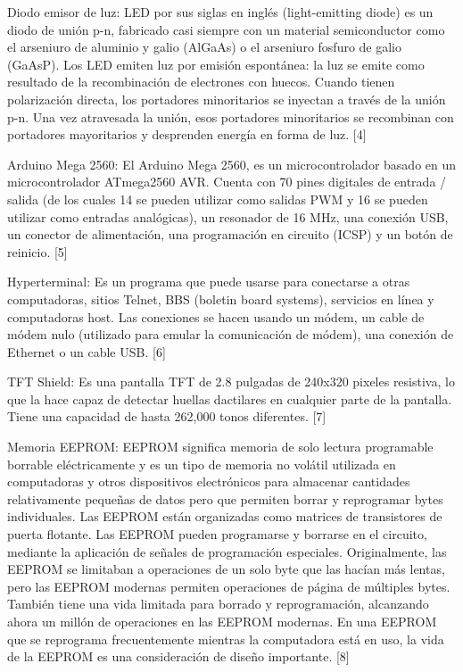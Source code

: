 \documentclass[conference]{IEEEtran}
\begin{document}
Diodo emisor de luz: LED por sus siglas en inglés (light-emitting diode) es un diodo de unión p-n, fabricado casi siempre con un material semiconductor como el arseniuro de aluminio y galio (AlGaAs) o el arseniuro fosfuro de galio (GaAsP). Los LED emiten luz por emisión espontánea: la luz se emite como resultado de la recombinación de electrones con huecos. Cuando tienen polarización directa, los portadores minoritarios se inyectan a través de la unión p-n. Una vez atravesada la unión, esos portadores minoritarios se recombinan con portadores mayoritarios y desprenden energía en forma de luz. [4]

Arduino Mega 2560: El Arduino Mega 2560, es un microcontrolador basado en un microcontrolador ATmega2560 AVR. Cuenta con 70 pines digitales de entrada / salida (de los cuales 14 se pueden utilizar como salidas PWM y 16 se pueden utilizar como entradas analógicas), un resonador de 16 MHz, una conexión USB, un conector de alimentación, una programación en circuito (ICSP) y un botón de reinicio. [5]

Hyperterminal: Es un programa que puede usarse para conectarse a otras computadoras, sitios Telnet, BBS (boletin board systems), servicios en línea y computadoras host. Las conexiones se hacen usando un módem, un cable de módem nulo (utilizado para emular la comunicación de módem), una conexión de Ethernet o un cable USB. [6]

TFT Shield: Es una pantalla TFT de 2.8 pulgadas de 240x320 pixeles resistiva, lo que la hace capaz de detectar huellas dactilares en cualquier parte de la pantalla. Tiene una capacidad de hasta 262,000 tonos diferentes. [7]

Memoria EEPROM: EEPROM significa memoria de solo lectura programable borrable eléctricamente y es un tipo de memoria no volátil utilizada en computadoras y otros dispositivos electrónicos para almacenar cantidades relativamente pequeñas de datos pero que permiten borrar y reprogramar bytes individuales. Las EEPROM están organizadas como matrices de transistores de puerta flotante. Las EEPROM pueden programarse y borrarse en el circuito, mediante la aplicación de señales de programación especiales. Originalmente, las EEPROM se limitaban a operaciones de un solo byte que las hacían más lentas, pero las EEPROM modernas permiten operaciones de página de múltiples bytes. También tiene una vida limitada para borrado y reprogramación, alcanzando ahora un millón de operaciones en las EEPROM modernas. En una EEPROM que se reprograma frecuentemente mientras la computadora está en uso, la vida de la EEPROM es una consideración de diseño importante. [8]
\end{document}
